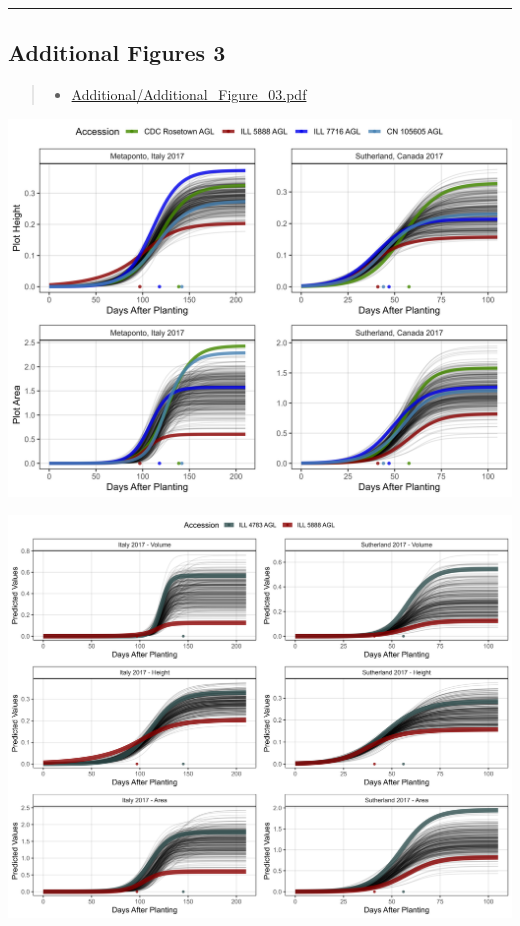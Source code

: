 \documentclass[
]{article}
\providecommand{\tightlist}{%
  \setlength{\itemsep}{0pt}\setlength{\parskip}{0pt}}
\begin{document}
\begin{center}\rule{0.5\linewidth}{0.5pt}\end{center}

\subsection{Additional Figures 3}\label{additional-figures-3}

\begin{quote}
\begin{itemize}
\tightlist
\item
  \url{Additional/Additional_Figure_03.pdf}
\end{itemize}
\end{quote}

\includegraphics{Additional/Additional_Figure_03_1.png}

\includegraphics{Additional/Additional_Figure_03_2.png}
\end{document}
